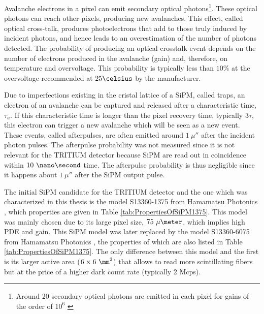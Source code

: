 Avalanche electrons in a pixel can emit secondary optical photons\footnote{Around 20 secondary optical photons are emitted in each pixel for gains of the order of $10^6$ \cite{CrosstalkProbability}}. These optical photons can reach other pixels, producing new avalanches. This effect, called optical cross-talk, produces photoelectrons that add to those truly induced by incident photons, and hence leads to an overestimation of the number of photons detected. The probability of producing an optical crosstalk event depends on the number of electrons produced in the avalanche (gain) and, therefore, on temperature and overvoltage. This probability is typically less than $10\%$ at the overvoltage recommended at $25\celsius$ by the manufacturer.


Due to imperfections existing in the cristal lattice of a SiPM, called traps, an electron of an avalanche can be captured and released after a characteristic time, $\tau_a$. If this characteristic time is longer than the pixel recovery time, typically $3\tau$, this electron can trigger a new avalanche which will be seen as a new event. These events, called  afterpulses, are often emitted around $1~\mu\second$ after the incident photon pulses. The afterpulse probability was not measured since it is not relevant for the TRITIUM detector because SiPM are read out in coincidence within $10~\nano\second$ time. The afterpulse probability is thus negligible since it happens about $1~\mu\second$ after the SiPM output pulse.

The initial SiPM candidate for the TRITIUM detector and the one which was characterized in this thesis is the model S13360-1375 from Hamamatsu Photonics \cite{DataSheetHammamatsu_1_SiPM_1375}, which properties are given in Table \ref{tab:PropertiesOfSiPM1375}. This model was mainly chosen due to its large pixel size, $75~\mu\meter$, which implies high PDE and gain. This SiPM model was later replaced by the model S13360-6075 from Hamamatsu Photonics \cite{DataSheetHammamatsu_1_SiPM_75}, the properties of which are also listed in Table \ref{tab:PropertiesOfSiPM1375}. The only difference between this model and the first is its larger active area ($6\times6~\mm^2$) that allows to read more scintillating fibers but at the price of a higher dark count rate (typically 2 Mcps). %

